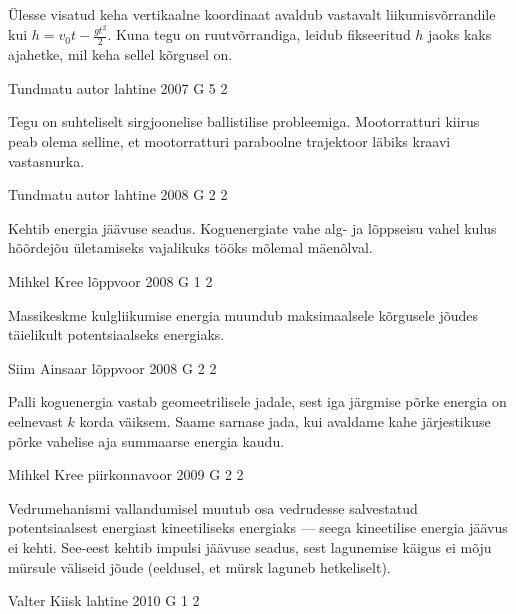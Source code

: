 \documentclass[11pt, twoside]{article}
\begin{document}
{{\ifHint
Ülesse visatud keha vertikaalne koordinaat avaldub vastavalt liikumisvõrrandile kui $h = v_0t - \frac{gt^2}{2}$. Kuna tegu on ruutvõrrandiga, leidub fikseeritud $h$ jaoks kaks ajahetke, mil keha sellel kõrgusel on.
\fi
}

{Tundmatu autor} %
{lahtine} %
{2007} %
{G 5} %
{2} %
{

\ifHint
Tegu on suhteliselt sirgjoonelise ballistilise probleemiga. Mootorratturi kiirus peab olema selline, et mootorratturi paraboolne trajektoor läbiks kraavi vastasnurka.
\fi
}

{Tundmatu autor} %
{lahtine} %
{2008} %
{G 2} %
{2} %
{

\ifHint
Kehtib energia jäävuse seadus. Koguenergiate vahe alg- ja lõppseisu vahel kulus hõõrdejõu ületamiseks vajalikuks tööks mõlemal mäenõlval.
\fi
}

{Mihkel Kree} %
{lõppvoor} %
{2008} %
{G 1} %
{2} %
{

\ifHint
Massikeskme kulgliikumise energia muundub maksimaalsele kõrgusele jõudes täielikult potentsiaalseks energiaks.
\fi
}

{Siim Ainsaar} %
{lõppvoor} %
{2008} %
{G 2} %
{2} %
{

\ifHint
Palli koguenergia vastab geomeetrilisele jadale, sest iga järgmise põrke energia on eelnevast $k$ korda väiksem. Saame sarnase jada, kui avaldame kahe järjestikuse põrke vahelise aja summaarse energia kaudu.
\fi
}

{Mihkel Kree} %
{piirkonnavoor} %
{2009} %
{G 2} %
{2} %
{

\ifHint
Vedrumehanismi vallandumisel muutub osa vedrudesse salvestatud potentsiaalsest energiast kineetiliseks energiaks --- seega kineetilise energia jäävus ei kehti. See-eest kehtib impulsi jäävuse seadus, sest lagunemise käigus ei mõju mürsule väliseid jõude (eeldusel, et mürsk laguneb hetkeliselt).
\fi
}

{Valter Kiisk} %
{lahtine} %
{2010} %
{G 1} %
{2} %
{

}}
\end{document}
